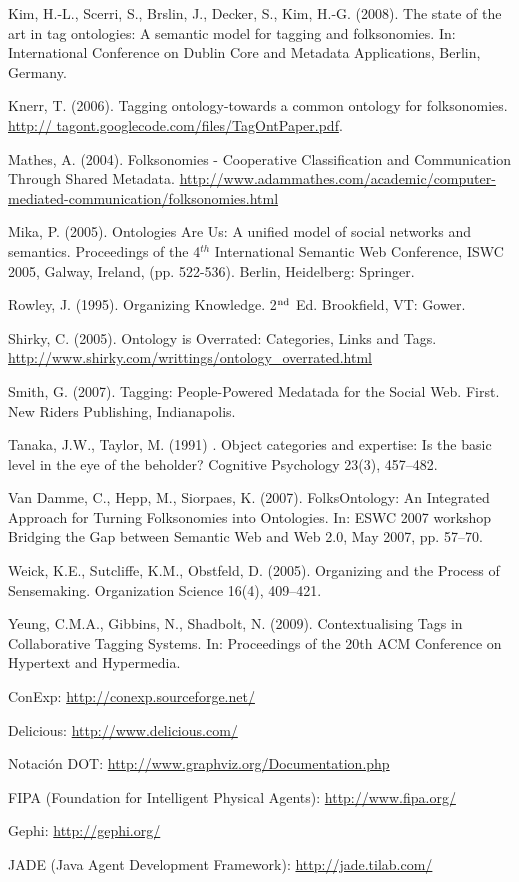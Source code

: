 \begin{thebibliography}{99}
 Kim, H.-L., Scerri, S., Brslin, J., Decker, S., Kim, H.-G. (2008). The state of the art in tag ontologies: A semantic model for tagging and folksonomies. In: International Conference on Dublin Core and Metadata Applications, Berlin, Germany.

 Knerr, T. (2006). Tagging ontology-towards a common ontology for folksonomies. \url{http:// tagont.googlecode.com/files/TagOntPaper.pdf}.

 Mathes, A. (2004). Folksonomies - Cooperative Classification and Communication Through Shared Metadata. \url{http://www.adammathes.com/academic/computer-mediated-communication/folksonomies.html}

 Mika, P. (2005). Ontologies Are Us: A unified model of social networks and semantics. Proceedings of the 4$^{th}$ International Semantic Web Conference, ISWC 2005, Galway, Ireland, (pp. 522-536). Berlin, Heidelberg: Springer.  

 Rowley, J. (1995). Organizing Knowledge. 2$^{\mbox{\scriptsize nd}}$ Ed. Brookfield, VT: Gower.

 Shirky, C. (2005). Ontology is Overrated: Categories, Links and Tags. \url{http://www.shirky.com/writtings/ontology_overrated.html}

 Smith, G. (2007). Tagging: People-Powered Medatada for the Social Web. First. New Riders Publishing, Indianapolis.

 Tanaka, J.W., Taylor, M. (1991) . Object categories and expertise: Is the basic level in the eye of the beholder? Cognitive Psychology 23(3), 457–482.

 Van Damme, C., Hepp, M., Siorpaes, K. (2007). FolksOntology: An Integrated Approach for Turning Folksonomies into Ontologies. In: ESWC 2007 workshop Bridging the Gap between Semantic Web and Web 2.0, May 2007, pp. 57–70.

 Weick, K.E., Sutcliffe, K.M., Obstfeld, D. (2005). Organizing and the Process of Sense\-making. Organization Science 16(4), 409–421.

 Yeung, C.M.A., Gibbins, N., Shadbolt, N. (2009). Contextualising Tags in Collaborative Tagging Systems. In: Proceedings of the 20th ACM Conference on Hypertext and 
Hypermedia.


 ConExp: \url{http://conexp.sourceforge.net/}

 Delicious: \url{http://www.delicious.com/}

 Notación DOT: \url{http://www.graphviz.org/Documentation.php}

 FIPA (Foundation for Intelligent Physical Agents): \url{http://www.fipa.org/}

 Gephi: \url{http://gephi.org/}

 JADE (Java Agent Development Framework): \url{http://jade.tilab.com/}

\end{thebibliography}







